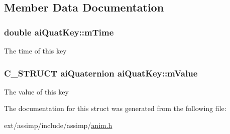 \subsection{Member Data Documentation}
\hypertarget{structai_quat_key_afb56b697e491c918bdeb1b32d03bbcf8}{
\subsubsection[{m\-Time}]{\setlength{\rightskip}{0pt plus 5cm}double ai\-Quat\-Key\-::m\-Time}}\label{structai_quat_key_afb56b697e491c918bdeb1b32d03bbcf8}
The time of this key \hypertarget{structai_quat_key_a08bf706065137951fd89c5914bb5a2aa}{
\subsubsection[{m\-Value}]{\setlength{\rightskip}{0pt plus 5cm}C\-\_\-\-S\-T\-R\-U\-C\-T {\bf ai\-Quaternion} ai\-Quat\-Key\-::m\-Value}}\label{structai_quat_key_a08bf706065137951fd89c5914bb5a2aa}
The value of this key 

The documentation for this struct was generated from the following file\-:\begin{DoxyCompactItemize}
\item 
ext/assimp/include/assimp/\hyperlink{anim_8h}{anim.\-h}\end{DoxyCompactItemize}
